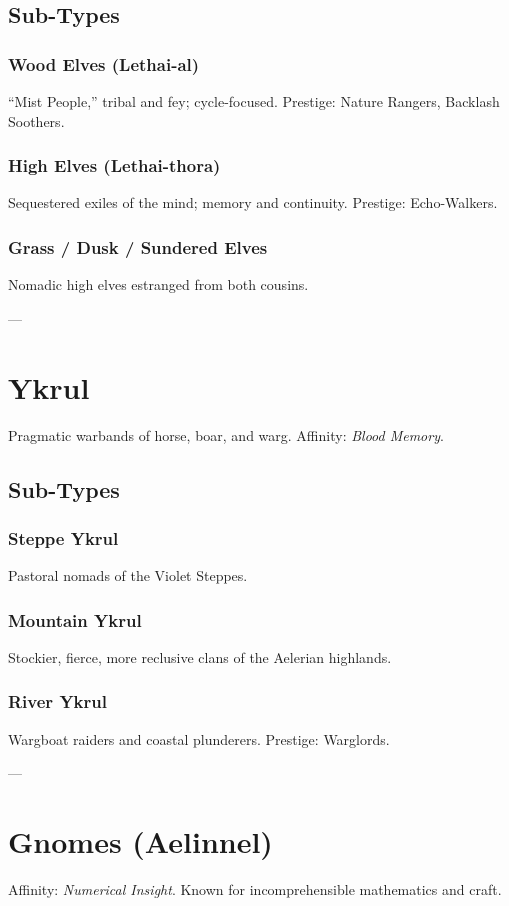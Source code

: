\documentclass[11pt]{article}
\begin{document}
\subsection{Sub-Types}
\subsubsection{Wood Elves (Lethai-al)}
“Mist People,” tribal and fey; cycle-focused. Prestige: Nature Rangers, Backlash Soothers.  

\subsubsection{High Elves (Lethai-thora)}
Sequestered exiles of the mind; memory and continuity. Prestige: Echo-Walkers.  

\subsubsection{Grass / Dusk / Sundered Elves}
Nomadic high elves estranged from both cousins.  

---

\section{Ykrul}
Pragmatic warbands of horse, boar, and warg.  
Affinity: \emph{Blood Memory}.  

\subsection{Sub-Types}
\subsubsection{Steppe Ykrul}
Pastoral nomads of the Violet Steppes.  

\subsubsection{Mountain Ykrul}
Stockier, fierce, more reclusive clans of the Aelerian highlands.  

\subsubsection{River Ykrul}
Wargboat raiders and coastal plunderers. Prestige: Warglords.  

---

\section{Gnomes (Aelinnel)}
Affinity: \emph{Numerical Insight}. Known for incomprehensible mathematics and craft.  
\end{document}
